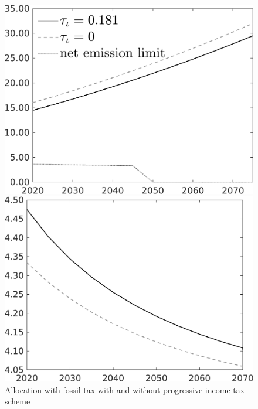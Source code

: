 \begin{figure}[h!!]
	\centering
	\caption{Allocation with fossil tax with and without progressive income tax scheme}\label{fig:AlloTAuf}
	\begin{minipage}[]{0.32\textwidth}
		\includegraphics[width=1\textwidth]{../../codding_model/own_basedOnFried/optimalPol_010922_revision/figures/all_13Sept22/CompTaul_Reg0_Emnet_spillover0_nsk0_xgr0_sep1_LFlimit0_emsbase1_countec0_GovRev1_etaa0.79_lgd1.png}
	\end{minipage}	
	\begin{minipage}[]{0.32\textwidth}
		\includegraphics[width=1\textwidth]{../../codding_model/own_basedOnFried/optimalPol_010922_revision/figures/all_13Sept22/CompTaul_Reg0_gAagg_spillover0_nsk0_xgr0_sep1_LFlimit0_emsbase1_countec0_GovRev1_etaa0.79_lgd0.png}

\end{minipage}
\end{figure}
